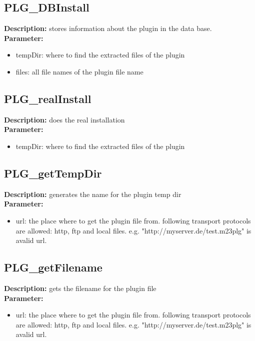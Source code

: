 \subsection{PLG\_DBInstall}
\textbf{Description:} stores information about the plugin in the data base.\\
\textbf{Parameter:}
\begin{itemize}
\item tempDir: where to find the extracted files of the plugin
\item files: all file names of the plugin file name
\end{itemize}

\subsection{PLG\_realInstall}
\textbf{Description:} does the real installation\\
\textbf{Parameter:}
\begin{itemize}
\item tempDir: where to find the extracted files of the plugin
\end{itemize}

\subsection{PLG\_getTempDir}
\textbf{Description:} generates the name for the plugin temp dir\\
\textbf{Parameter:}
\begin{itemize}
\item url: the place where to get the plugin file from. following transport protocols are allowed: http, ftp and local files. e.g. "http://myserver.de/test.m23plg" is avalid url.
\end{itemize}

\subsection{PLG\_getFilename}
\textbf{Description:} gets the filename for the plugin file\\
\textbf{Parameter:}
\begin{itemize}
\item url: the place where to get the plugin file from. following transport protocols are allowed: http, ftp and local files. e.g. "http://myserver.de/test.m23plg" is avalid url.
\end{itemize}


